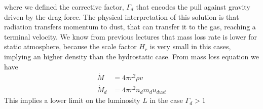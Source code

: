 \documentclass[main.tex]{subfiles}
\begin{document}
where we defined the corrective factor, $\Gamma_d$ that encodes the pull against gravity driven by the drag force. The physical interpretation of this solution is that radiation transfers momentum to dust, that can transfer it to the gas, reaching a terminal velocity.
We know from previous lectures that mass loss rate is lower for static atmosphere, because the scale factor $H_r$ is very small in this cases, implying an higher density than the hydrostatic case.
From mass loss equation we have
\begin{align}
    \dot M&= 4\pi r^2 \rho v\\
    \dot M_d&=4\pi r^2 n_d m_d u_{dust}
\end{align}
This implies a lower limit on the luminosity $L$ in the case $\Gamma_d>1$
\end{document}
